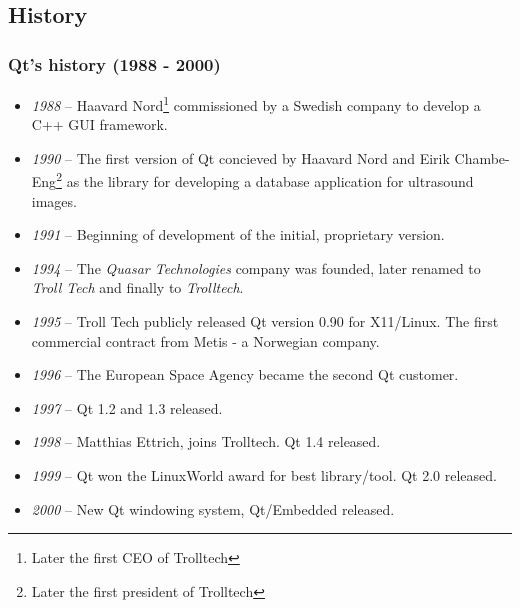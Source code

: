 \subsection{History}
\begin{frame}
  \frametitle{Qt's history (1988 - 2000)}
  \scriptsize
  \begin{itemize}
    \item {\em 1988} -- Haavard Nord\footnote{\tiny Later the first CEO of Trolltech}
      commissioned by a Swedish company to develop a C++ GUI framework.
    \item {\em 1990} -- The first version of Qt concieved by Haavard Nord and
      Eirik Chambe-Eng\footnote{\tiny Later the first president of Trolltech} as the
      library for developing a database application for ultrasound images.
    \item {\em 1991} -- Beginning of development of the initial, proprietary version.
    \item {\em 1994} -- The {\em Quasar Technologies} company was founded, later
      renamed to {\em Troll Tech} and finally to {\em Trolltech}.
    \item {\em 1995} -- Troll Tech publicly released Qt version 0.90 for X11/Linux.
      The first commercial contract from Metis - a Norwegian company.
    \item {\em 1996} -- The European Space Agency became the second Qt customer.
    \item {\em 1997} -- Qt 1.2 and 1.3 released.
    \item {\em 1998} -- Matthias Ettrich, joins Trolltech. Qt 1.4 released.
    \item {\em 1999} -- Qt won the LinuxWorld award for best library/tool.
      Qt 2.0 released.
    \item {\em 2000} -- New Qt windowing system, Qt/Embedded released.
  \end{itemize}
\end{frame}


